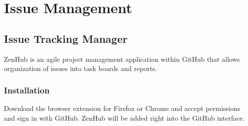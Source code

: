 \documentclass[letterpaper,10pt,english]{sphinxmanual}
\begin{document}
\chapter{Issue Management}
\label{\detokenize{test_plan/issue_management:issue-management}}\label{\detokenize{test_plan/issue_management::doc}}

\section{Issue Tracking Manager}
\label{\detokenize{test_plan/issue_management:issue-tracking-manager}}
ZenHub is an agile project management application within GitHub that allows organization of issues into task boards and reports.


\subsection{Installation}
\label{\detokenize{test_plan/issue_management:installation}}
Download the browser extension for Firefox or Chrome and accept permissions and sign in with GitHub. ZenHub will be added right into the GitHub interface.
\end{document}
